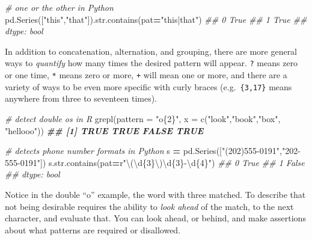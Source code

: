 \documentclass[
  12pt,
  krantz2]{krantz}
\makeatletter
\newenvironment{Shaded}{\begin{snugshade}}{\end{snugshade}}
\newcommand{\AttributeTok}[1]{\textcolor[rgb]{0.61,0.61,0.61}{#1}}
\newcommand{\BuiltInTok}[1]{#1}
\newcommand{\CommentTok}[1]{\textcolor[rgb]{0.37,0.37,0.37}{\textit{#1}}}
\newcommand{\DocumentationTok}[1]{\textcolor[rgb]{0.37,0.37,0.37}{\textbf{\textit{#1}}}}
\newcommand{\FunctionTok}[1]{\textcolor[rgb]{0,0,0}{#1}}
\newcommand{\NormalTok}[1]{#1}
\newcommand{\OperatorTok}[1]{\textcolor[rgb]{0.43,0.43,0.43}{\textbf{#1}}}
\newcommand{\SpecialCharTok}[1]{\textcolor[rgb]{0,0,0}{#1}}
\newcommand{\StringTok}[1]{\textcolor[rgb]{0.5,0.5,0.5}{#1}}
\newcommand{\VerbatimStringTok}[1]{\textcolor[rgb]{0.5,0.5,0.5}{#1}}
\newenvironment{kframe}{%
\medskip{}
\setlength{\fboxsep}{.8em}
 \def\at@end@of@kframe{}%
 \ifinner\ifhmode%
  \def\at@end@of@kframe{\end{minipage}}%
  \begin{minipage}{\columnwidth}%
 \fi\fi%
 \def\FrameCommand##1{\hskip\@totalleftmargin \hskip-\fboxsep
 \colorbox{shadecolor}{##1}\hskip-\fboxsep
     \hskip-\linewidth \hskip-\@totalleftmargin \hskip\columnwidth}%
 \MakeFramed {\advance\hsize-\width
   \@totalleftmargin\z@ \linewidth\hsize
   \@setminipage}}%
 {\par\unskip\endMakeFramed%
 \at@end@of@kframe}
\renewenvironment{Shaded}{\begin{kframe}}{\end{kframe}}
\makeatother
\begin{document}
\begin{Shaded}
\begin{Highlighting}[]
\CommentTok{\# one or the other in Python}
\NormalTok{pd.Series([}\StringTok{"this"}\NormalTok{,}\StringTok{"that"}\NormalTok{]).}\BuiltInTok{str}\NormalTok{.contains(pat}\OperatorTok{=}\StringTok{"this|that"}\NormalTok{)}
\CommentTok{\#\# 0    True}
\CommentTok{\#\# 1    True}
\CommentTok{\#\# dtype: bool}
\end{Highlighting}
\end{Shaded}

In addition to concatenation, alternation, and grouping, there are more general ways to \emph{quantify} how many times the desired pattern will appear. \texttt{?} means zero or one time, \texttt{*} means zero or more, \texttt{+} will mean one or more, and there are a variety of ways to be even more specific with curly braces (e.g.~\texttt{\{3,17\}} means anywhere from three to seventeen times).

\begin{Shaded}
\begin{Highlighting}[]
\CommentTok{\# detect double o\textquotesingle{}s in R}
\FunctionTok{grepl}\NormalTok{(}\AttributeTok{pattern =} \StringTok{"o\{2\}"}\NormalTok{, }\AttributeTok{x =} \FunctionTok{c}\NormalTok{(}\StringTok{"look"}\NormalTok{,}\StringTok{"book"}\NormalTok{,}\StringTok{"box"}\NormalTok{, }\StringTok{"hellooo"}\NormalTok{))}
\DocumentationTok{\#\# [1]  TRUE  TRUE FALSE  TRUE}
\end{Highlighting}
\end{Shaded}

\begin{Shaded}
\begin{Highlighting}[]
\CommentTok{\# detects phone number formats in Python}
\NormalTok{s }\OperatorTok{=}\NormalTok{ pd.Series([}\StringTok{"(202)555{-}0191"}\NormalTok{,}\StringTok{"202{-}555{-}0191"}\NormalTok{])}
\NormalTok{s.}\BuiltInTok{str}\NormalTok{.contains(pat}\OperatorTok{=}\VerbatimStringTok{r"\textbackslash{}(\textbackslash{}d}\SpecialCharTok{\{3\}}\VerbatimStringTok{\textbackslash{})\textbackslash{}d}\SpecialCharTok{\{3\}}\VerbatimStringTok{{-}\textbackslash{}d}\SpecialCharTok{\{4\}}\VerbatimStringTok{"}\NormalTok{)}
\CommentTok{\#\# 0     True}
\CommentTok{\#\# 1    False}
\CommentTok{\#\# dtype: bool}
\end{Highlighting}
\end{Shaded}

Notice in the double ``o'' example, the word with three matched. To describe that not being desirable requires the ability to \emph{look ahead} of the match, to the next character, and evaluate that. You can look ahead, or behind, and make assertions about what patterns are required or disallowed.
\end{document}

